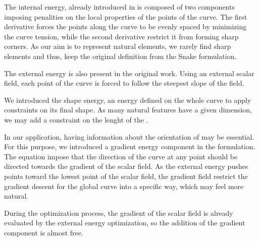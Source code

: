 The internal energy, already introduced in \citep{Kass1988} is composed of two components imposing penalities on the local properties of the points of the curve. The first derivative forces the points along the curve to be evenly spaced by minimizing the curve tension, while the second derivative restrict it from forming sharp corners. As our aim is to represent natural elements, we rarely find sharp elements and thus, keep the original definition from the Snake formulation.

The external energy is also present in the original work. Using an external scalar field, each point of the curve is forced to follow the steepest slope of the field. 

We introduced the shape energy, an energy defined on the whole curve to apply constraints on its final shape. As many natural features have a given dimension, we may add a constraint on the lenght of the . 

In our application, having information about the orientation of  may be essential. For this purpose, we introduced a gradient energy component in the formulation. The equation impose that the direction of the curve at any point should be directed towards the gradient of the scalar field. As the external energy pushes points toward the lowest point of the scalar field, the gradient field restrict the gradient descent for the global curve into a specific way, which may feel more natural.

During the optimization process, the gradient of the scalar field is already evaluated by the external energy optimization, so the addition of the gradient component is almost free.




